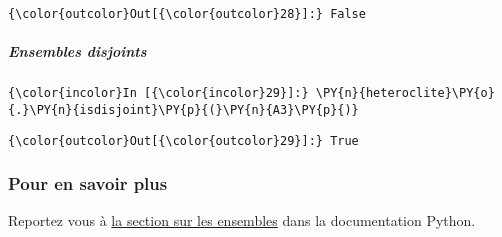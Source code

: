 \begin{Verbatim}[commandchars=\\\{\}]
{\color{outcolor}Out[{\color{outcolor}28}]:} False
\end{Verbatim}
            
    \hypertarget{ensembles-disjoints}{%
\subparagraph{Ensembles disjoints}\label{ensembles-disjoints}}

    \begin{Verbatim}[commandchars=\\\{\}]
{\color{incolor}In [{\color{incolor}29}]:} \PY{n}{heteroclite}\PY{o}{.}\PY{n}{isdisjoint}\PY{p}{(}\PY{n}{A3}\PY{p}{)}
\end{Verbatim}


\begin{Verbatim}[commandchars=\\\{\}]
{\color{outcolor}Out[{\color{outcolor}29}]:} True
\end{Verbatim}
            
    \hypertarget{pour-en-savoir-plus}{%
\subsubsection{Pour en savoir plus}\label{pour-en-savoir-plus}}

    Reportez vous à
\href{https://docs.python.org/3/library/stdtypes.html\#set-types-set-frozenset}{la
section sur les ensembles} dans la documentation Python.
